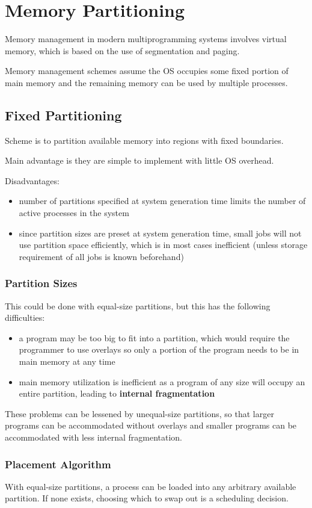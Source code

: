 \documentclass[11pt]{article}
\begin{document}
\section{Memory Partitioning}
\label{sec:org7527168}
Memory management in modern multiprogramming systems involves virtual memory, which
is based on the use of segmentation and paging.

Memory management schemes assume the OS occupies some fixed portion of main memory
and the remaining memory can be used by multiple processes.
\subsection{Fixed Partitioning}
\label{sec:orgaf34e7b}
Scheme is to partition available memory into regions with fixed boundaries.

Main advantage is they are simple to implement with little OS overhead.

Disadvantages:
\begin{itemize}
\item number of partitions specified at system generation time limits the number of
active processes in the system
\item since partition sizes are preset at system generation time, small jobs will not
use partition space efficiently, which is in most cases inefficient (unless
storage requirement of all jobs is known beforehand)
\end{itemize}
\subsubsection{Partition Sizes}
\label{sec:orgff5fdd6}
This could be done with equal-size partitions, but this has the following
difficulties:
\begin{itemize}
\item a program may be too big to fit into a partition, which would require the
programmer to use overlays so only a portion of the program needs to be in main
memory at any time
\item main memory utilization is inefficient as a program of any size will occupy an
entire partition, leading to \textbf{internal fragmentation}
\end{itemize}

These problems can be lessened by unequal-size partitions, so that larger programs
can be accommodated without overlays and smaller programs can be accommodated with
less internal fragmentation.
\subsubsection{Placement Algorithm}
\label{sec:org8430455}
With equal-size partitions, a process can be loaded into any arbitrary available
partition. If none exists, choosing which to swap out is a scheduling decision.
\end{document}
